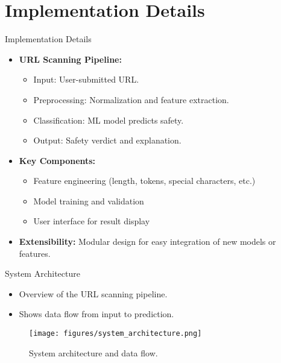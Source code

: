 \documentclass{beamer}
\begin{document}
\section{Implementation Details}
\begin{frame}{Implementation Details}
  \begin{itemize}
    \item \textbf{URL Scanning Pipeline:}
      \begin{itemize}
        \item Input: User-submitted URL.
        \item Preprocessing: Normalization and feature extraction.
        \item Classification: ML model predicts safety.
        \item Output: Safety verdict and explanation.
      \end{itemize}
    \item \textbf{Key Components:}
      \begin{itemize}
        \item Feature engineering (length, tokens, special characters, etc.)
        \item Model training and validation
        \item User interface for result display
      \end{itemize}
    \item \textbf{Extensibility:} Modular design for easy integration of new models or features.
  \end{itemize}
\end{frame}

\begin{frame}{System Architecture}
    \begin{itemize}
        \item Overview of the URL scanning pipeline.
        \item Shows data flow from input to prediction.
    \end{itemize}
    \begin{figure}[h]
        \centering
        \texttt{[image: figures/system\_architecture.png]} %
        \caption{System architecture and data flow.}
    \end{figure}
\end{frame}

\end{document}
